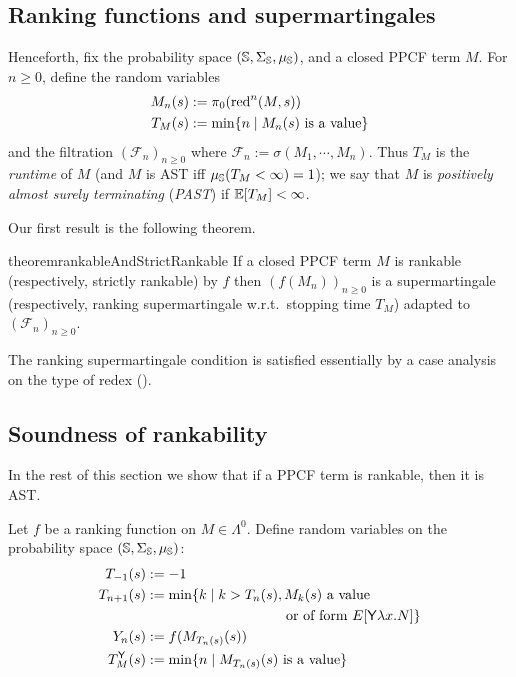\subsection{Ranking functions and supermartingales}

Henceforth, fix the probability space $({\mathbb{S}}, \Sigma_{\mathbb{S}}, \mu_{{\mathbb{S}}})$, and a closed PPCF term $M$.
For $n \geq 0$, define the random variables 
\begin{align*}
M_n(s) &:= \pi_0 (\operatorname{red}^n(M, s))\\
T_M(s) &:= \min \{n \mid \hbox{$M_n(s)$ is a value}\}
\end{align*} 
and the filtration $(\mathcal{F}_n)_{n \geq 0}$ where $\mathcal{F}_n := \sigma(M_1, \cdots, M_n)$.
Thus $T_M$ is the \emph{runtime} of $M$ (and $M$ is AST iff $\mu_{{\mathbb{S}}}(T_M < \infty) = 1$); we say that $M$ is \emph{positively almost surely terminating} (\emph{PAST}) if $\mathbb{E}[T_M] < \infty$.

Our first result is the following theorem.
\begin{restatable}{theorem}{rankableAndStrictRankable}
\label{thm:rankable and strict rankable}
If a closed PPCF term $M$ is rankable (respectively, strictly rankable) by $f$ 
then $(f(M_n))_{n \geq 0}$ is a supermartingale (respectively, ranking supermartingale w.r.t.~stopping time $T_M$) adapted to $(\mathcal{F}_n)_{n \geq 0}$. %
\end{restatable}

The ranking supermartingale condition is satisfied essentially by a case analysis on the type of redex ().

\subsection{Soundness of rankability}

In the rest of this section we show that if a PPCF term is rankable, then it is AST. 

Let $f$ be a ranking function on $M \in \Lambda^0$.
Define random variables on the probability space $({\mathbb{S}}, \Sigma_{\mathbb{S}}, \mu_{{\mathbb{S}}})$:
\begin{align}
T_{-1}(s) & := -1 \nonumber \\
T_{n+1}(s) & := \min \{ k \mid k>T_n(s), M_k(s) \textrm{ a value} \nonumber\\
& \qquad\qquad\qquad\qquad\qquad \hbox{or of form } E[\tY \lambda x. N] \} \nonumber \\
Y_n(s) & := f(M_{T_n(s)}(s)) \nonumber \\
T_M^\tY(s) &:= \min \set{n \mid M_{T_n(s)}(s) \textrm{ is a value}} \label{eq:y stopping time} 
\end{align}

